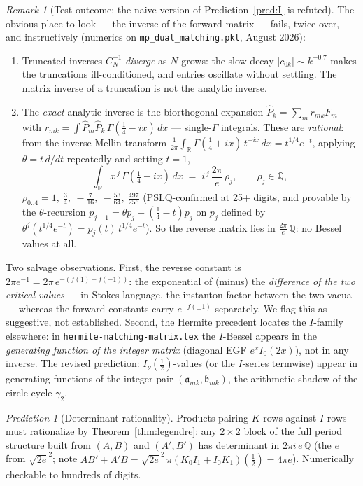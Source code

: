 \documentclass[11pt]{article}
\theoremstyle{definition}
\theoremstyle{remark}
\newtheorem{remark}[proposition]{Remark}
\newtheorem{prediction}[proposition]{Prediction}
\newcommand{\R}{\mathbb{R}}
\newcommand{\Q}{\mathbb{Q}}
\newcommand{\G}{\Gamma}
\begin{document}
\begin{remark}[Test outcome: the naive version of
Prediction~\ref{pred:I} is refuted]\label{rem:testI}
The obvious place to look --- the inverse of the forward matrix ---
fails, twice over, and instructively (numerics on
\texttt{mp\_dual\_matching.pkl}, August 2026):
\begin{enumerate}
\item Truncated inverses $C_N^{-1}$ \emph{diverge} as $N$ grows:
the slow decay $|c_{0k}| \sim k^{-0.7}$ makes the truncations
ill-conditioned, and entries oscillate without settling. The
matrix inverse of a truncation is not the analytic inverse.
\item The \emph{exact} analytic inverse is the biorthogonal
expansion $\widehat P_k = \sum_m r_{mk} F_m$ with
$r_{mk} = \int \widehat P_m \widehat P_k\,\G(\tfrac14 - ix)\,dx$
--- single-$\G$ integrals. These are \emph{rational}: from the
inverse Mellin transform $\tfrac1{2\pi}\int_\R
\G(\tfrac14+ix)\,t^{-ix}\,dx = t^{1/4}e^{-t}$, applying
$\theta = t\,d/dt$ repeatedly and setting $t = 1$,
\[
  \int_\R x^{\,j}\,\G(\tfrac14 - ix)\,dx
  \;=\; i^{\,j}\,\frac{2\pi}{e}\,\rho_j, \qquad \rho_j \in \Q,
\]
$\rho_{0..4} = 1,\ \tfrac34,\ -\tfrac7{16},\ -\tfrac{53}{64},\
\tfrac{497}{256}$ (PSLQ-confirmed at 25+ digits, and provable by
the $\theta$-recursion $p_{j+1} = \theta p_j + (\tfrac14 - t)p_j$
on $p_j$ defined by $\theta^j(t^{1/4}e^{-t}) =
p_j(t)\,t^{1/4}e^{-t}$). So the reverse matrix lies in
$\tfrac{2\pi}{e}\,\Q$: no Bessel values at all.
\end{enumerate}
Two salvage observations. First, the reverse constant is
$2\pi e^{-1} = 2\pi\,e^{-(f(1) - f(-1))}$: the exponential of
(minus) the \emph{difference of the two critical values} --- in
Stokes language, the instanton factor between the two vacua ---
whereas the forward constants carry $e^{-f(\pm1)}$ separately. We
flag this as suggestive, not established. Second, the Hermite
precedent locates the $I$-family elsewhere: in
\texttt{hermite-matching-matrix.tex} the $I$-Bessel appears in the
\emph{generating function of the integer matrix} (diagonal EGF
$e^x I_0(2x)$), not in any inverse. The revised prediction:
$I_\nu(\tfrac12)$-values (or the $I$-series termwise) appear in
generating functions of the integer pair
$(\mathfrak a_{mk}, \mathfrak b_{mk})$, the arithmetic shadow of
the circle cycle $\gamma_2$.
\end{remark}

\begin{prediction}[Determinant rationality]\label{pred:det}
Products pairing $K$-rows against $I$-rows must rationalize by
Theorem~\ref{thm:legendre}: any $2\times2$ block of the full
period structure built from $(A, B)$ and $(A', B')$ has
determinant in $2\pi i\,e\,\Q$ (the $e$ from $\sqrt{2e}^2$; note
$AB' + A'B = \sqrt{2e}^2\,\pi(K_0I_1 + I_0K_1)(\tfrac12)
= 4\pi e$). Numerically checkable to hundreds of digits.
\end{prediction}
\end{document}
